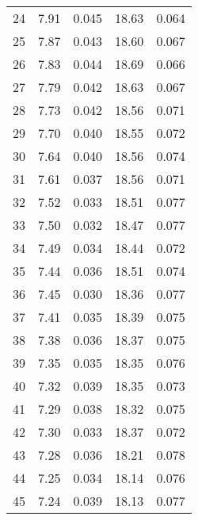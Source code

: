 \begin{table}
\begin{tabular}{c|ll|ll}
24 & 7.91 & 0.045 & 18.63 & 0.064 \\
25 & 7.87 & 0.043 & 18.60 & 0.067 \\
26 & 7.83 & 0.044 & 18.69 & 0.066 \\
27 & 7.79 & 0.042 & 18.63 & 0.067 \\
28 & 7.73 & 0.042 & 18.56 & 0.071 \\
29 & 7.70 & 0.040 & 18.55 & 0.072 \\
30 & 7.64 & 0.040 & 18.56 & 0.074 \\
31 & 7.61 & 0.037 & 18.56 & 0.071 \\
32 & 7.52 & 0.033 & 18.51 & 0.077 \\
33 & 7.50 & 0.032 & 18.47 & 0.077 \\
34 & 7.49 & 0.034 & 18.44 & 0.072 \\
35 & 7.44 & 0.036 & 18.51 & 0.074 \\
36 & 7.45 & 0.030 & 18.36 & 0.077 \\
37 & 7.41 & 0.035 & 18.39 & 0.075 \\
38 & 7.38 & 0.036 & 18.37 & 0.075 \\
39 & 7.35 & 0.035 & 18.35 & 0.076 \\
40 & 7.32 & 0.039 & 18.35 & 0.073 \\
41 & 7.29 & 0.038 & 18.32 & 0.075 \\
42 & 7.30 & 0.033 & 18.37 & 0.072 \\
43 & 7.28 & 0.036 & 18.21 & 0.078 \\
44 & 7.25 & 0.034 & 18.14 & 0.076 \\
45 & 7.24 & 0.039 & 18.13 & 0.077 \\
               \hline
        \end{tabular}
    \end{table}
    \clearpage

